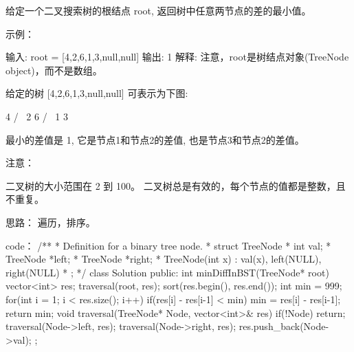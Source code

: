 给定一个二叉搜索树的根结点 root, 返回树中任意两节点的差的最小值。

示例：

输入: root = [4,2,6,1,3,null,null]
输出: 1
解释:
注意，root是树结点对象(TreeNode object)，而不是数组。

给定的树 [4,2,6,1,3,null,null] 可表示为下图:

          4
        /   \
      2      6
     / \    
    1   3  

最小的差值是 1, 它是节点1和节点2的差值, 也是节点3和节点2的差值。

注意：

    二叉树的大小范围在 2 到 100。
    二叉树总是有效的，每个节点的值都是整数，且不重复。



























思路：
遍历，排序。

























code：
/**
 * Definition for a binary tree node.
 * struct TreeNode {
 *     int val;
 *     TreeNode *left;
 *     TreeNode *right;
 *     TreeNode(int x) : val(x), left(NULL), right(NULL) {}
 * };
 */
class Solution {
public:
    int minDiffInBST(TreeNode* root) {
        vector<int> res;
        traversal(root, res);
        sort(res.begin(), res.end());
        int min = 999;
        for(int i = 1; i < res.size(); i++)
        {
            if(res[i] - res[i-1] < min)
                min = res[i] - res[i-1];
        }
        return min;
    }
    void traversal(TreeNode* Node, vector<int>& res)
    {
        if(!Node) return;
        traversal(Node->left, res);
        traversal(Node->right, res);
        res.push_back(Node->val);
    }
};